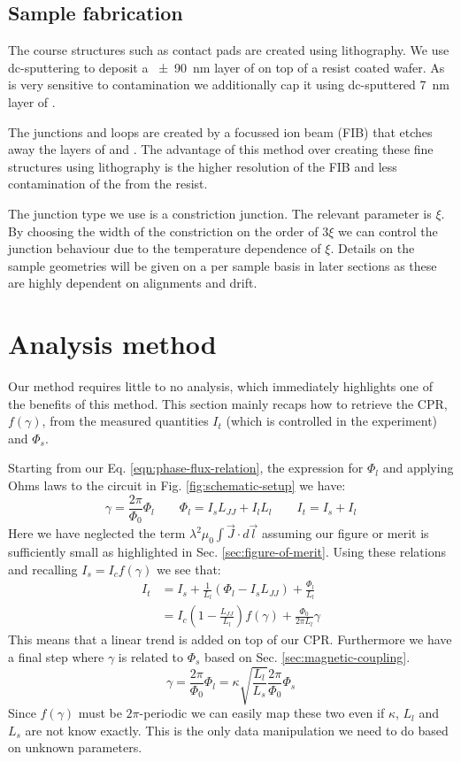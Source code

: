 \subsection{Sample fabrication}
The course structures such as contact pads are created using lithography. We use dc-sputtering to deposit a \qty{\pm 90}{\nano\meter} layer of  on top of a resist coated  wafer. As  is very sensitive to contamination we additionally cap it using dc-sputtered \qty{7}{\nano\meter} layer of .

The junctions and loops are created by a focussed ion beam (FIB) that etches away the layers of  and . The advantage of this method over creating these fine structures using lithography is the higher resolution of the FIB and less contamination of the  from the resist.

The junction type we use is a constriction junction. The relevant parameter is $\xi$. By choosing the width of the constriction on the order of $3\xi$ we can control the junction behaviour due to the temperature dependence of $\xi$\cite{tinkhamIntroductionSuperconductivity}. Details on the sample geometries will be given on a per sample basis in later sections as these are highly dependent on alignments and drift.

\section{Analysis method}
Our method requires little to no analysis, which immediately highlights one of the benefits of this method. This section mainly recaps how to retrieve the CPR, $f(\gamma)$, from the measured quantities $I_t$ (which is controlled in the experiment) and $\Phi_s$.

Starting from our Eq. \ref{eqn:phase-flux-relation}, the expression for $\Phi_l$ and applying Ohms laws to the circuit in Fig. \ref{fig:schematic-setup} we have:
\begin{equation}
	\gamma = \frac{2\pi}{\Phi_0}\Phi_l \qquad \Phi_l = I_sL_{JJ} + I_lL_l \qquad I_t = I_s + I_l
\end{equation}
Here we have neglected the term $\lambda^2\mu_0 \int \vec{J}\cdot d \vec{l}$ assuming our figure or merit is sufficiently small as highlighted in Sec. \ref{sec:figure-of-merit}. Using these relations and recalling $I_s = I_cf(\gamma)$ we see that:
\begin{align}
	I_t &= I_s + \frac{1}{L_l}\left(\Phi_l - I_sL_{JJ}\right) + \frac{\Phi_l}{L_l} \nonumber \\
	    &= I_c \left(1 - \frac{L_{JJ}}{L_l}\right)f(\gamma) + \frac{\Phi_0}{2\pi L_l}\gamma
\end{align}
This means that a linear trend is added on top of our CPR. Furthermore we have a final step where $\gamma$ is related to $\Phi_s$ based on Sec. \ref{sec:magnetic-coupling}.
\begin{equation}
	\gamma = \frac{2\pi}{\Phi_0}\Phi_l = \kappa \sqrt{\frac{L_l}{L_s}} \frac{2\pi}{\Phi_0} \Phi_s
\end{equation}
Since $f(\gamma)$ must be $2\pi$-periodic we can easily map these two even if $\kappa$, $L_l$ and $L_s$ are not know exactly. This is the only data manipulation we need to do based on unknown parameters.